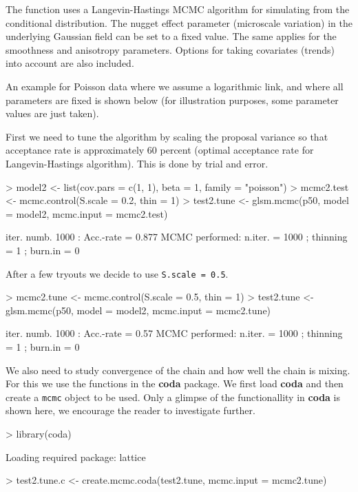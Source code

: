 \documentclass[12pt,a4paper]{article}
\newcommand{\strong}[1]{{\textbf{ #1}}}
\let\pkg=\strong
\newcommand{\code}[1]{\texttt{\small #1}}
\begin{document}
The function uses a Langevin-Hastings MCMC algorithm for simulating from the conditional distribution.
The nugget effect parameter (microscale variation) in the underlying Gaussian field can be set to a fixed value. 
The same applies for the smoothness and anisotropy parameters. Options for taking covariates (trends) into 
account are also included.

An example for Poisson data where we assume a logarithmic link, and
where all parameters are fixed is shown below 
(for illustration purposes, some parameter values are just taken).  

First we need to tune the algorithm by scaling the proposal variance so that acceptance rate is approximately 60 percent (optimal
acceptance rate for Langevin-Hastings algorithm). This is done by trial and error. 
\begin{Schunk}
\begin{Sinput}
> model2 <- list(cov.pars = c(1, 1), beta = 1, family = "poisson")
> mcmc2.test <- mcmc.control(S.scale = 0.2, thin = 1)
> test2.tune <- glsm.mcmc(p50, model = model2, mcmc.input = mcmc2.test)
\end{Sinput}
\begin{Soutput}
iter. numb. 1000  : Acc.-rate =  0.877 
MCMC performed: n.iter. =  1000 ; thinning =  1 ; burn.in =  0 
\end{Soutput}
\end{Schunk}
After a few tryouts we decide to use \code{S.scale = 0.5}.
\begin{Schunk}
\begin{Sinput}
> mcmc2.tune <- mcmc.control(S.scale = 0.5, thin = 1)
> test2.tune <- glsm.mcmc(p50, model = model2, mcmc.input = mcmc2.tune)
\end{Sinput}
\begin{Soutput}
iter. numb. 1000  : Acc.-rate =  0.57 
MCMC performed: n.iter. =  1000 ; thinning =  1 ; burn.in =  0 
\end{Soutput}
\end{Schunk}
We also need to study convergence of the chain and how well the chain
is mixing. For this we use the functions in the \pkg{coda} package. We
first load \pkg{coda} and then create a \code{mcmc} object to
be used. Only a glimpse of the functionallity in \pkg{coda} is shown
here, we encourage the reader to investigate further.

\begin{Schunk}
\begin{Sinput}
> library(coda)
\end{Sinput}
\begin{Soutput}
Loading required package: lattice
\end{Soutput}
\begin{Sinput}
> test2.tune.c <- create.mcmc.coda(test2.tune, mcmc.input = mcmc2.tune)
\end{Sinput}
\end{Schunk}
\end{document}
